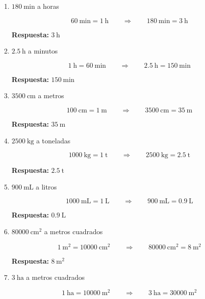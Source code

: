 \documentclass[12pt]{article}
\begin{document}
\begin{enumerate}[itemsep=0.4cm]
		\[
		1\ \text{km} = 1000\ \text{m}
		\qquad\Rightarrow\qquad
		2.4\ \text{km} = 2400\ \text{m}
		\]
		
		\textbf{Respuesta:} $2400\ \text{m}$
		
		\newpage
		
		\vspace*{1em}
		
		\item $180\ \text{min}$ a horas
		
		\[
		60\ \text{min} = 1\ \text{h}
		\qquad\Rightarrow\qquad
		180\ \text{min} = 3\ \text{h}
		\]
		
		\textbf{Respuesta:} $3\ \text{h}$
		
		\item $2.5\ \text{h}$ a minutos
		
		\[
		1\ \text{h} = 60\ \text{min}
		\qquad\Rightarrow\qquad
		2.5\ \text{h} = 150\ \text{min}
		\]
		
		\textbf{Respuesta:} $150\ \text{min}$
		
		\item $3500\ \text{cm}$ a metros
		
		\[
		100\ \text{cm} = 1\ \text{m}
		\qquad\Rightarrow\qquad
		3500\ \text{cm} = 35\ \text{m}
		\]
		
		\textbf{Respuesta:} $35\ \text{m}$
		
		\item $2500\ \text{kg}$ a toneladas
		
		\[
		1000\ \text{kg} = 1\ \text{t}
		\qquad\Rightarrow\qquad
		2500\ \text{kg} = 2.5\ \text{t}
		\]
		
		\textbf{Respuesta:} $2.5\ \text{t}$
		
		\item $900\ \text{mL}$ a litros
		
		\[
		1000\ \text{mL} = 1\ \text{L}
		\qquad\Rightarrow\qquad
		900\ \text{mL} = 0.9\ \text{L}
		\]
		
		\textbf{Respuesta:} $0.9\ \text{L}$
		
		\item $80000\ \text{cm}^2$ a metros cuadrados
		
		\[
		1\ \text{m}^2 = 10000\ \text{cm}^2
		\qquad\Rightarrow\qquad
		80000\ \text{cm}^2 = 8\ \text{m}^2
		\]
		
		\textbf{Respuesta:} $8\ \text{m}^2$
		
		\item $3\ \text{ha}$ a metros cuadrados
		
		\[
		1\ \text{ha} = 10000\ \text{m}^2
		\qquad\Rightarrow\qquad
		3\ \text{ha} = 30000\ \text{m}^2
		\]
		

\end{enumerate}
\end{document}
